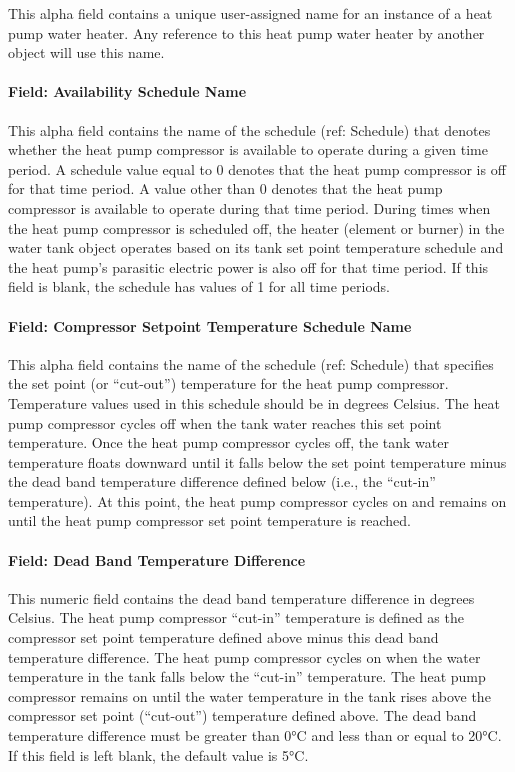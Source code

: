 This alpha field contains a unique user-assigned name for an instance of a heat pump water heater. Any reference to this heat pump water heater by another object will use this name.

\paragraph{Field: Availability Schedule Name}\label{field-availability-schedule-name-019}

This alpha field contains the name of the schedule (ref: Schedule) that denotes whether the heat pump compressor is available to operate during a given time period. A schedule value equal to 0 denotes that the heat pump compressor is off for that time period. A value other than 0 denotes that the heat pump compressor is available to operate during that time period. During times when the heat pump compressor is scheduled off, the heater (element or burner) in the water tank object operates based on its tank set point temperature schedule and the heat pump's parasitic electric power is also off for that time period. If this field is blank, the schedule has values of 1 for all time periods.

\paragraph{Field: Compressor Setpoint Temperature Schedule Name}\label{field-compressor-setpoint-temperature-schedule-name}

This alpha field contains the name of the schedule (ref: Schedule) that specifies the set point (or ``cut-out'') temperature for the heat pump compressor. Temperature values used in this schedule should be in degrees Celsius. The heat pump compressor cycles off when the tank water reaches this set point temperature. Once the heat pump compressor cycles off, the tank water temperature floats downward until it falls below the set point temperature minus the dead band temperature difference defined below (i.e., the ``cut-in'' temperature). At this point, the heat pump compressor cycles on and remains on until the heat pump compressor set point temperature is reached.

\paragraph{Field: Dead Band Temperature Difference}\label{field-dead-band-temperature-difference-000}

This numeric field contains the dead band temperature difference in degrees Celsius. The heat pump compressor ``cut-in'' temperature is defined as the compressor set point temperature defined above minus this dead band temperature difference. The heat pump compressor cycles on when the water temperature in the tank falls below the ``cut-in'' temperature. The heat pump compressor remains on until the water temperature in the tank rises above the compressor set point (``cut-out'') temperature defined above. The dead band temperature difference must be greater than 0°C and less than or equal to 20°C. If this field is left blank, the default value is 5°C.

